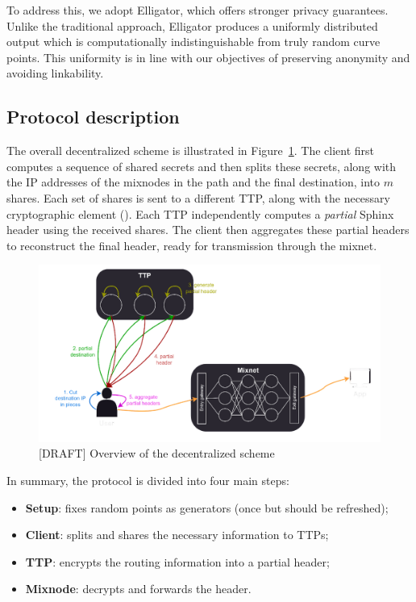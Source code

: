 To address this, we adopt Elligator, which offers stronger privacy guarantees. 
Unlike the traditional approach, Elligator produces a uniformly distributed output which is computationally indistinguishable from truly random curve points. 
This uniformity is in line with our objectives of preserving anonymity and avoiding linkability. 

\subsection{Protocol description}

The overall decentralized scheme is illustrated in Figure~\ref{fig:overall_schema}.  
The client first computes a sequence of shared secrets and then splits these secrets, along with the IP addresses of the mixnodes in the path and the final destination, into $m$ shares.  
Each set of shares is sent to a different TTP, along with the necessary cryptographic element (\A{}).  
Each TTP independently computes a \textit{partial} Sphinx header using the received shares.  
The client then aggregates these partial headers to reconstruct the final header, ready for transmission through the mixnet.

\begin{figure}[H]
    \centering
    \includegraphics[width=0.8\linewidth]{Images/sphinx_ttp.png}
    \caption{[DRAFT] Overview of the decentralized scheme}
    \label{fig:overall_schema}
\end{figure}

\noindent In summary, the protocol is divided into four main steps:
\begin{itemize}
    \item \textbf{Setup}: fixes random points as generators (once but should be refreshed);
    \item \textbf{Client}: splits and shares the necessary information to TTPs;
    \item \textbf{TTP}: encrypts the routing information into a partial header;
    \item \textbf{Mixnode}: decrypts and forwards the header.
\end{itemize}


